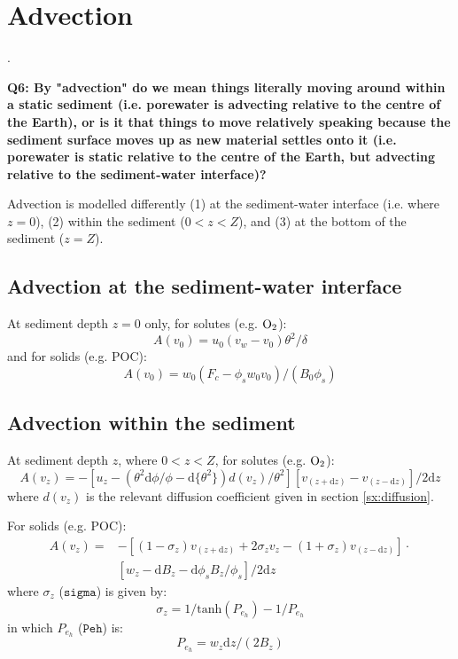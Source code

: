\documentclass[a4paper]{article}
\newcommand{\D}[1]{\mathrm{d}#1}
\newcommand{\code}[1]{\texttt{#1}}
\newcommand{\wtf}[1]{\textcolor{Cerulean}{\textbf{#1}}}
\begin{document}
\section{Advection}\label{sx:advection}.

\wtf{Q6: By "advection" do we mean things literally moving around within a static sediment (i.e. porewater is advecting relative to the centre of the Earth), or is it that things to move relatively speaking because the sediment surface moves up as new material settles onto it (i.e. porewater is static relative to the centre of the Earth, but advecting relative to the sediment-water interface)?}

Advection is modelled differently (1) at the sediment-water interface (i.e. where $z = 0$), (2) within the sediment ($0 < z < Z$), and (3) at the bottom of the sediment ($z = Z$).

\subsection{Advection at the sediment-water interface}\label{sx:adv_swi}

At sediment depth $z = 0$ only, for solutes (e.g. $\ce{O2}$):
\begin{equation}
A(v_0) = u_0 (v_w - v_0) \theta^2 / \delta
\end{equation}
and for solids (e.g. POC):
\begin{equation}
A(v_0) = w_0 (F_c - \phi_s w_0 v_0) / (B_0 \phi_s)
\end{equation}

\subsection{Advection within the sediment}

At sediment depth $z$, where $0 < z < Z$, for solutes (e.g. $\ce{O2}$):
\begin{equation}
A(v_z) = -[u_z - (\theta^2 \D{\phi} / \phi - \D{\{\theta^2\}}) d(v_z) / \theta^2] [v_{(z+\D{z})} - v_{(z-\D{z})}] / 2 \D{z}
\end{equation}
where $d(v_z)$ is the relevant diffusion coefficient given in section \ref{sx:diffusion}.

For solids (e.g. POC):
\begin{equation}
\begin{split}
A(v_z) = & -[(1 - \sigma_z) v_{(z+\D{z})} + 2 \sigma_z v_z - (1 + \sigma_z) v_{(z-\D{z})}] \cdot \\
& [w_z - \D{B_z} - \D{\phi_s} B_z / \phi_s] / 2 \D{z}
\end{split}
\end{equation}
where $\sigma_z$ ($\code{sigma}$) is given by:
\begin{equation}
\sigma_z = 1 / \mathrm{tanh}(P_{e_h}) - 1 / P_{e_h}
\end{equation}
in which $P_{e_h}$ ($\code{Peh}$) is:
\begin{equation}
P_{e_h} = w_z \D{z} / (2 B_z)
\end{equation}
\end{document}
